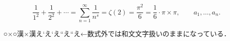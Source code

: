 \documentclass{article}
\begin{document}
\makeatletter

\[
 \frac1{1^2}+\frac1{2^2}+\cdots=
\sum_{n=1}^\infty \frac1{n^s}=\zeta(2)=\frac{\pi^2}{6}
=\frac16\cdot \pi\times\pi,\qquad a_1,\dots,a_n.
\]


○×○漢×漢\times え\ltjjachar`\“え\ltjalchar`\“え\textquotedblleft え“え←数式外では和文文字扱いのままになっている．
\end{document}
